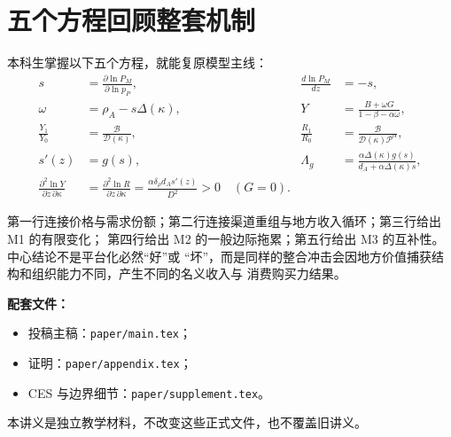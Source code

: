 \documentclass[UTF8,11pt,scheme=chinese,fontset=fandol]{ctexart}
\newcommand{\calB}{\mathcal B}
\newcommand{\calD}{\mathcal D}
\newcommand{\calP}{\mathcal P}
\theoremstyle{definition}
\begin{document}
\section{五个方程回顾整套机制}

本科生掌握以下五个方程，就能复原模型主线：
\begin{align*}
s&=\frac{\partial\ln P_M}{\partial\ln p_P},
&\frac{d\ln P_M}{dz}&=-s,\\
\omega&=\rho_A-s\Delta(\kappa),
&Y&=\frac{B+\omega G}{1-\beta-\alpha\omega},\\
\frac{Y_1}{Y_0}&=\frac{\calB}{\calD(\kappa)},
&\frac{R_1}{R_0}&=\frac{\calB}{\calD(\kappa)\calP^\alpha},\\
s'(z)&=g(s),
&\Lambda_g&=\frac{\alpha\Delta(\kappa)g(s)}
{d_A+\alpha\Delta(\kappa)s},\\
\frac{\partial^2\ln Y}{\partial z\,\partial\kappa}
&=\frac{\partial^2\ln R}{\partial z\,\partial\kappa}
=\frac{\alpha\delta_\rho d_A s'(z)}{D^2}>0\quad(G=0).
\end{align*}

第一行连接价格与需求份额；第二行连接渠道重组与地方收入循环；第三行给出 M1 的有限变化；
第四行给出 M2 的一般边际拖累；第五行给出 M3 的互补性。中心结论不是平台化必然“好”或
“坏”，而是同样的整合冲击会因地方价值捕获结构和组织能力不同，产生不同的名义收入与
消费购买力结果。

\bigskip
\noindent\textbf{配套文件：}
\begin{itemize}[leftmargin=2em,itemsep=0.1em,topsep=0.2em]
  \item 投稿主稿：\texttt{paper/main.tex}；
  \item 证明：\texttt{paper/appendix.tex}；
  \item CES 与边界细节：\texttt{paper/supplement.tex}。
\end{itemize}
本讲义是独立教学材料，不改变这些正式文件，也不覆盖旧讲义。
\end{document}
